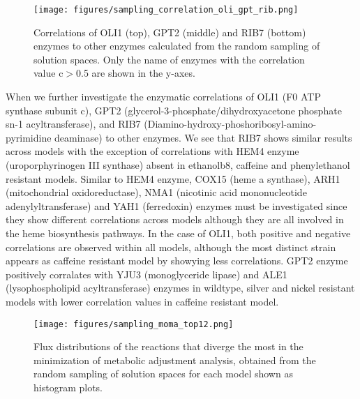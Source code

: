 \begin{figure}[H]
  \begin{center}
  \texttt{[image: figures/sampling\_correlation\_oli\_gpt\_rib.png]}
  \caption[Correlations of OLI1 (top), GPT2 (middle) and RIB7 (bottom) enzymes to other enzymes calculated from the random sampling of solution spaces. Only the name of enzymes with the correlation value c$>$0.5 are shown in the y-axes]{Correlations of OLI1 (top), GPT2 (middle) and RIB7 (bottom) enzymes to other enzymes calculated from the random sampling of solution spaces. Only the name of enzymes with the correlation value c$>$0.5 are shown in the y-axes.}
  \label{fig:sampling_correlation_oli_gpt_rib}
  \end{center}
\end{figure}

When we further investigate the enzymatic correlations of OLI1 (F0 ATP synthase subunit c), GPT2 (glycerol-3-phosphate/dihydroxyacetone phosphate sn-1 acyltransferase), and RIB7 (Diamino-hydroxy-phoshoribosyl-amino-pyrimidine deaminase) to other enzymes. We see that RIB7 shows similar results across models with the exception of correlations with HEM4 enzyme (uroporphyrinogen III synthase) absent in ethanolb8, caffeine and phenylethanol resistant models. Similar to HEM4 enzyme, COX15 (heme a synthase), ARH1 (mitochondrial oxidoreductase), NMA1 (nicotinic acid mononucleotide adenylyltransferase) and YAH1 (ferredoxin) enzymes must be investigated since they show different correlations across models although they are all involved in the heme biosynthesis pathways. In the case of OLI1, both positive and negative correlations are observed within all models, although the most distinct strain appears as caffeine resistant model by showying less correlations. GPT2 enzyme positively corralates with YJU3 (monoglyceride lipase) and ALE1 (lysophospholipid acyltransferase) enzymes in wildtype, silver and nickel resistant models with lower correlation values in caffeine resistant model.

\begin{figure}[H]
  \begin{center}
  \texttt{[image: figures/sampling\_moma\_top12.png]}
  \caption[Flux distributions of the reactions that diverge the most in the minimization of metabolic adjustment analysis, obtained from the random sampling of solution spaces for each model shown as histogram plots]{Flux distributions of the reactions that diverge the most in the minimization of metabolic adjustment analysis, obtained from the random sampling of solution spaces for each model shown as histogram plots.}
  \label{fig:sampling_moma_top12}
  \end{center}
\end{figure}

